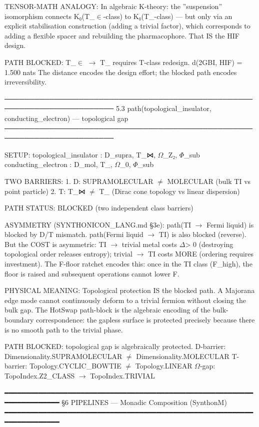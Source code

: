 \documentclass[12pt,a4paper]{article}
\begin{document}
TENSOR-MATH ANALOGY:
In algebraic K-theory: the ''suspension'' isomorphism connects
K₀(T\_$\in$-class) to K₀(T\_\textbar{}-class) --- but only via an explicit
stabilisation construction (adding a trivial factor), which
corresponds to adding a flexible spacer and rebuilding the pharmacophore.
That IS the HIF design.

PATH BLOCKED: T\_$\in$ $\rightarrow$ T\_\textbar{} requires T-class redesign.
d(2GBI, HIF) = 1.500 nats
The distance encodes the design effort; the blocked path encodes irreversibility.

────────────────────────────────────────────────────────────────────────
5.3  path(topological\_insulator, conducting\_electron) --- topological gap
────────────────────────────────────────────────────────────────────────

SETUP:
topological\_insulator : D\_supra, T\_⋈, $\Omega$\_Z₂, $\Phi$\_sub
conducting\_electron   : D\_mol,   T\_\textbar{},  $\Omega$\_0,  $\Phi$\_sub

TWO BARRIERS:
1. D: SUPRAMOLECULAR $\neq$ MOLECULAR (bulk TI vs point particle)
2. T: T\_⋈ $\neq$ T\_\textbar{} (Dirac cone topology vs linear dispersion)

PATH STATUS: BLOCKED (two independent class barriers)

ASYMMETRY (SYNTHONICON\_LANG.md §3e):
path(TI $\rightarrow$ Fermi liquid) is blocked by D/T mismatch.
path(Fermi liquid $\rightarrow$ TI) is also blocked (reverse).
But the COST is asymmetric: TI $\rightarrow$ trivial metal costs $\Delta$\xi \textgreater{} 0
(destroying topological order releases entropy); trivial $\rightarrow$ TI costs
MORE (ordering requires investment). The F-floor ratchet encodes this:
once in the TI class (F\_high), the floor is raised and subsequent
operations cannot lower F.

PHYSICAL MEANING:
Topological protection IS the blocked path. A Majorana edge mode
cannot continuously deform to a trivial fermion without closing
the bulk gap. The HotSwap path-block is the algebraic encoding of
the bulk-boundary correspondence: the gapless surface is protected
precisely because there is no smooth path to the trivial phase.

PATH BLOCKED: topological gap is algebraically protected.
D-barrier: Dimensionality.SUPRAMOLECULAR $\neq$ Dimensionality.MOLECULAR
T-barrier: Topology.CYCLIC\_BOWTIE $\neq$ Topology.LINEAR
$\Omega$-gap:     TopoIndex.Z2\_CLASS $\rightarrow$ TopoIndex.TRIVIAL

━━━━━━━━━━━━━━━━━━━━━━━━━━━━━━━━━━━━━━━━━━━━━━━━━━━━━━━━━━━━━━━━━━━━━━━━
§6  PIPELINES  ---  Monadic Composition (SynthonM)
━━━━━━━━━━━━━━━━━━━━━━━━━━━━━━━━━━━━━━━━━━━━━━━━━━━━━━━━━━━━━━━━━━━━━━━━
\end{document}

